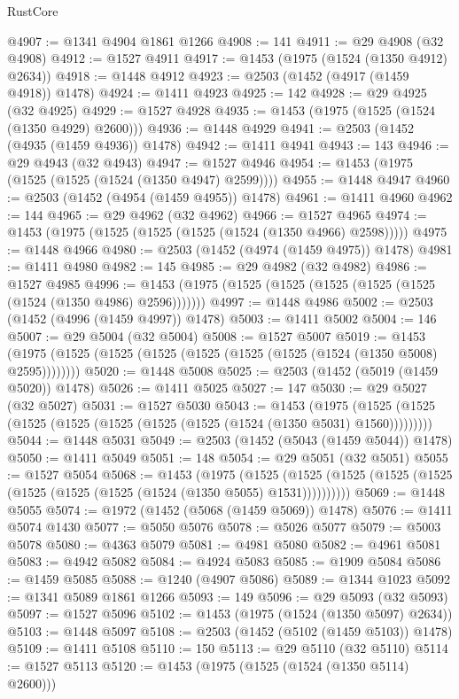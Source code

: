 \begin{lexlean}{RustCore}
\begin{coremodule}
@4907 := @1341 @4904 @1861 @1266
@4908 := 141
@4911 := @29 @4908 (@32 @4908)
@4912 := @1527 @4911
@4917 := @1453 (@1975 (@1524 (@1350 @4912) @2634))
@4918 := @1448 @4912
@4923 := @2503 (@1452 (@4917 (@1459 @4918)) @1478)
@4924 := @1411 @4923
@4925 := 142
@4928 := @29 @4925 (@32 @4925)
@4929 := @1527 @4928
@4935 := @1453 (@1975 (@1525 (@1524 (@1350 @4929) @2600)))
@4936 := @1448 @4929
@4941 := @2503 (@1452 (@4935 (@1459 @4936)) @1478)
@4942 := @1411 @4941
@4943 := 143
@4946 := @29 @4943 (@32 @4943)
@4947 := @1527 @4946
@4954 := @1453 (@1975 (@1525 (@1525 (@1524 (@1350 @4947) @2599))))
@4955 := @1448 @4947
@4960 := @2503 (@1452 (@4954 (@1459 @4955)) @1478)
@4961 := @1411 @4960
@4962 := 144
@4965 := @29 @4962 (@32 @4962)
@4966 := @1527 @4965
@4974 := @1453 (@1975 (@1525 (@1525 (@1525 (@1524 (@1350 @4966) @2598)))))
@4975 := @1448 @4966
@4980 := @2503 (@1452 (@4974 (@1459 @4975)) @1478)
@4981 := @1411 @4980
@4982 := 145
@4985 := @29 @4982 (@32 @4982)
@4986 := @1527 @4985
@4996 := @1453 (@1975 (@1525 (@1525 (@1525 (@1525 (@1525 (@1524 (@1350 @4986) @2596)))))))
@4997 := @1448 @4986
@5002 := @2503 (@1452 (@4996 (@1459 @4997)) @1478)
@5003 := @1411 @5002
@5004 := 146
@5007 := @29 @5004 (@32 @5004)
@5008 := @1527 @5007
@5019 := @1453 (@1975 (@1525 (@1525 (@1525 (@1525 (@1525 (@1525 (@1524 (@1350 @5008) @2595))))))))
@5020 := @1448 @5008
@5025 := @2503 (@1452 (@5019 (@1459 @5020)) @1478)
@5026 := @1411 @5025
@5027 := 147
@5030 := @29 @5027 (@32 @5027)
@5031 := @1527 @5030
@5043 := @1453
    (@1975 (@1525 (@1525 (@1525 (@1525 (@1525 (@1525 (@1525 (@1524 (@1350 @5031) @1560)))))))))
@5044 := @1448 @5031
@5049 := @2503 (@1452 (@5043 (@1459 @5044)) @1478)
@5050 := @1411 @5049
@5051 := 148
@5054 := @29 @5051 (@32 @5051)
@5055 := @1527 @5054
@5068 := @1453
    (@1975
      (@1525 (@1525 (@1525 (@1525 (@1525 (@1525 (@1525 (@1525 (@1524 (@1350 @5055) @1531))))))))))
@5069 := @1448 @5055
@5074 := @1972 (@1452 (@5068 (@1459 @5069)) @1478)
@5076 := @1411 @5074 @1430
@5077 := @5050 @5076
@5078 := @5026 @5077
@5079 := @5003 @5078
@5080 := @4363 @5079
@5081 := @4981 @5080
@5082 := @4961 @5081
@5083 := @4942 @5082
@5084 := @4924 @5083
@5085 := @1909 @5084
@5086 := @1459 @5085
@5088 := @1240 (@4907 @5086)
@5089 := @1344 @1023
@5092 := @1341 @5089 @1861 @1266
@5093 := 149
@5096 := @29 @5093 (@32 @5093)
@5097 := @1527 @5096
@5102 := @1453 (@1975 (@1524 (@1350 @5097) @2634))
@5103 := @1448 @5097
@5108 := @2503 (@1452 (@5102 (@1459 @5103)) @1478)
@5109 := @1411 @5108
@5110 := 150
@5113 := @29 @5110 (@32 @5110)
@5114 := @1527 @5113
@5120 := @1453 (@1975 (@1525 (@1524 (@1350 @5114) @2600)))

\end{coremodule}
\end{lexlean}
